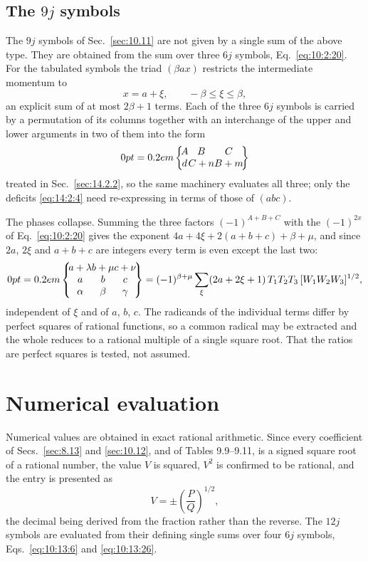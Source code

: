 \subsection{The $9j$ symbols}\label{sec:14.2.3}
The $9j$ symbols of Sec.~\ref{sec:10.11} are not given by a single sum of the
above type. They are obtained from the sum over three $6j$ symbols,
Eq.~\eqref{eq:10:2:20}. For the tabulated symbols the triad $(\beta a x)$
restricts the intermediate momentum to
\begin{equation}
x=a+\xi, \qquad -\beta \leq \xi \leq \beta ,\label{eq:14:2:8}
\end{equation}
an explicit sum of at most $2\beta+1$ terms. Each of the three $6j$ symbols is
carried by a permutation of its columns together with an interchange of the
upper and lower arguments in two of them into the form
\[\sixj{A}{B}{C}{d}{C+n}{B+m}\] treated in
Sec.~\ref{sec:14.2.2}, so the same machinery evaluates all three; only the
deficits \eqref{eq:14:2:4} need re-expressing in terms of those of $(abc)$.

The phases collapse. Summing the three factors $(-1)^{A+B+C}$ with the
$(-1)^{2x}$ of Eq.~\eqref{eq:10:2:20} gives the exponent
$4a+4\xi+2(a+b+c)+\beta+\mu$, and since $2a$, $2\xi$ and $a+b+c$ are integers
every term is even except the last two:
\begin{equation}
\ninej{a+\lambda}{b+\mu}{c+\nu}{a}{b}{c}{\alpha}{\beta}{\gamma}
=(-1)^{\beta+\mu}\sum_{\xi}(2a+2\xi+1)\,T_1T_2T_3\,[W_1W_2W_3]^{1/2},
\label{eq:14:2:9}
\end{equation}
independent of $\xi$ and of $a$, $b$, $c$. The radicands of the individual
terms differ by perfect squares of rational functions, so a common radical may
be extracted and the whole reduces to a rational multiple of a single square
root. That the ratios are perfect squares is tested, not assumed.

\section{Numerical evaluation}\label{sec:14.3}
Numerical values are obtained in exact rational arithmetic. Since every
coefficient of Secs.~\ref{sec:8.13} and \ref{sec:10.12}, and of
Tables 9.9--9.11, is a signed square root of a rational number, the value $V$ is squared, $V^{2}$ is
confirmed to be rational, and the entry is presented as
\begin{equation}
V=\pm\left(\frac{P}{Q}\right)^{1/2},\label{eq:14:3:1}
\end{equation}
the decimal being derived from the fraction rather than the reverse. The
$12j$ symbols are evaluated from their defining single sums over four $6j$
symbols, Eqs.~\eqref{eq:10:13:6} and \eqref{eq:10:13:26}.

